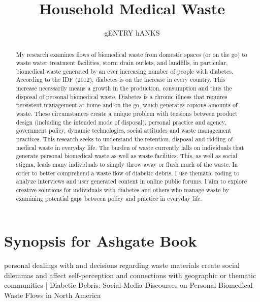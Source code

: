 \documentclass[12pt]{article}
\title{Household Medical Waste}
\author{gENTRY hANKS}
\begin{document}
\maketitle

\newpage
\begin{abstract}
\doublespacing 
My research examines flows of biomedical waste from domestic spaces (or on the go) to waste water treatment facilities, storm drain outlets, and landfills, in particular, biomedical waste generated by an ever increasing number of people with diabetes. According to the IDF (2012), diabetes is on the increase in every country. This increase necessarily means a growth in the production, consumption and thus the disposal of personal biomedical waste. Diabetes is a chronic illness that requires persistent management at home and on the go, which generates copious amounts of waste. These circumstances create a unique problem with tensions between product design (including the intended mode of disposal), personal practice and agency, government policy, dynamic technologies, social attitudes and waste management practices. This research seeks to understand the retention, disposal and ridding of medical waste in everyday life. The burden of waste currently falls on individuals that generate personal biomedical waste as well as waste facilities.  This, as well as social stigma, leads many individuals to simply throw away or flush much of the waste.  In order to better comprehend a waste flow of diabetic debris, I use thematic coding to analyze interviews and user generated content in online public forums. I aim to explore creative solutions for individuals with diabetes and others who manage waste by examining potential gaps between policy and practice in everyday life.

\end{abstract}


\newpage
\section{Synopsis for Ashgate Book}

personal dealings with and decisions regarding waste materials create social dilemmas and affect self-perception and connections with geographic or thematic communities 
| Diabetic Debris: Social Media Discourses on Personal Biomedical Waste Flows in North America 


\newpage
\end{document}
